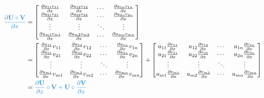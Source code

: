 \documentclass{ctexart}
\newcommand{\blue}[1]{\textcolor{Solarized-blue}{#1}}
\theoremstyle{definition}
\def \Uv {\mathbf{U}}
\def \Vv {\mathbf{V}}
\begin{document}
\begin{align*}
    \blue{\frac{\partial \Uv \circ \Vv}{\partial x}} & = \begin{bmatrix}
        \frac{\partial u_{11} v_{11}}{\partial x} & \frac{\partial u_{12} v_{12}}{\partial x} & \cdots & \frac{\partial u_{1n} v_{1n}}{\partial x} \\
        \frac{\partial u_{21} v_{21}}{\partial x} & \frac{\partial u_{22} v_{22}}{\partial x} & \cdots & \frac{\partial u_{2n} v_{2n}}{\partial x} \\
        \vdots                                    & \vdots                                    & \ddots & \vdots                                    \\
        \frac{\partial u_{m1} v_{m1}}{\partial x} & \frac{\partial u_{m2} v_{m2}}{\partial x} & \cdots & \frac{\partial u_{mn} v_{mn}}{\partial x} \\
    \end{bmatrix}                                                                   \\
                                                     & = \begin{bmatrix}
        \frac{\partial u_{11}}{\partial x} v_{11} & \frac{\partial u_{12}}{\partial x} v_{12} & \cdots & \frac{\partial u_{1n}}{\partial x} v_{1n} \\
        \frac{\partial u_{21}}{\partial x} v_{21} & \frac{\partial u_{22}}{\partial x} v_{22} & \cdots & \frac{\partial u_{2n}}{\partial x} v_{2n} \\
        \vdots                                    & \vdots                                    & \ddots & \vdots                                    \\
        \frac{\partial u_{m1}}{\partial x} v_{m1} & \frac{\partial u_{m2}}{\partial x} v_{m2} & \cdots & \frac{\partial u_{mn}}{\partial x} v_{mn} \\
    \end{bmatrix} + \begin{bmatrix}
        u_{11} \frac{\partial v_{11}}{\partial x} & u_{12} \frac{\partial v_{12}}{\partial x} & \cdots & u_{1n} \frac{\partial v_{1n}}{\partial x} \\
        u_{21} \frac{\partial v_{21}}{\partial x} & u_{22} \frac{\partial v_{22}}{\partial x} & \cdots & u_{2n} \frac{\partial v_{2n}}{\partial x} \\
        \vdots                                    & \vdots                                    & \ddots & \vdots                                    \\
        u_{m1} \frac{\partial v_{m1}}{\partial x} & u_{m2} \frac{\partial v_{m2}}{\partial x} & \cdots & u_{mn} \frac{\partial v_{mn}}{\partial x} \\
    \end{bmatrix}                                      \\
                                                     & = \blue{\frac{\partial \Uv}{\partial x} \circ \Vv + \Uv \circ \frac{\partial \Vv}{\partial x}}
\end{align*}
\end{document}
